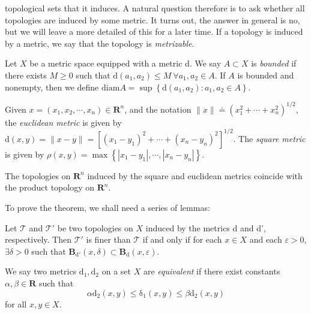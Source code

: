 topological sets that it induces. A natural question therefore is to ask whether
all topologies are induced by some metric.
It turns out, the answer in general is no, but we will leave a
more detailed of this for a later time. If a topology is induced by a metric, we
say that the topology is \emph{metrizable}.
\begin{definition}
\label{def:bounded-wrt-metric}
Let \(X\) be a metric space equipped with a metric \textrm{d}.
We say \(A \subset X\) is \emph{bounded} if there exists \(M \ge 0\)
such that \(\mathrm{d}(a_{1}, a_{2}) \le M \ \forall a_{1}, a_{2} \in A\).
If \(A\) is bounded and nonempty, then we define
\(\mathrm{diam}A = \sup\left\{ \mathrm{d}(a_{1}, a_{2}): a_{1}, a_{2} \in A
\right\}\).
\end{definition}
\begin{definition}
\label{def:euclidean-metric}
Given \(x = (x_{1}, x_{2}, \cdots, x_{n}) \in \mathbf{R}^{n}\),
and the notation \(\| x \| \doteq (x_{1}^{2} + \cdots +
x_{n}^{2})^{1/2}\), the \emph{euclidean metric} is given by
\(\mathrm{d}(x,y) = \| x-y \| = \left[ (x_{1} - y_{1})^{2} + \cdots +
(x_{n} - y_{n})^{2} \right]^{1/2}\).
The \emph{square metric} is given by
\(\rho(x, y) = \max\left\{ | x_{1} - y_{1}|, \cdots, |x_{n} - y_{n}|
\right\}\).
\end{definition}
\begin{theorem}
\label{thm:induce-product-top}
The topologies on \(\mathbf{R}^{n}\) induced by the square and euclidean
metrics coincide with the product topology on \(\mathbf{R}^{n}\).
\end{theorem}
To prove the theorem, we shall need a series of lemmas:
\begin{lemma}
\label{lem:finer-top-in-balls}
Let \(\mathcal{T}\) and \(\mathcal{T'}\) be two topologies on \(X\)
induced by the metrics \textrm{d} and \textrm{d'}, respectively.
Then \(\mathcal{T'}\) is finer than \(\mathcal{T}\) if and only if for each
\(x \in X\) and each \(\varepsilon > 0\), \(\exists \delta > 0\) such that
\(\mathbf{B}_{\mathrm{d'}}(x, \delta) \subset
\mathbf{B}_{\mathrm{d}}(x, \varepsilon)\).
\end{lemma}
\begin{definition}
\label{def:equiv-metric}
We say two metrics \(\mathrm{d_{1}}, \mathrm{d_{2}}\) on a set \(X\)
are \emph{equivalent} if there exist constants \(\alpha, \beta \in
\mathbf{R}\) such that
\begin{equation*}
\alpha \mathrm{d_{2}}(x,y) \le \mathrm\delta_{1}(x,y) \le \beta
\mathrm{d_{2}}(x,y)
\end{equation*}
for all \(x, y \in X\).
\end{definition}
